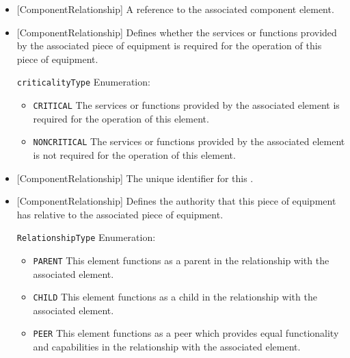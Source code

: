 \begin{itemize}

\item {}[ComponentRelationship] \newline A reference to the associated component element.

\item {}[ComponentRelationship] \newline Defines whether the services or functions provided by the associated piece of equipment is required for the operation of this piece of equipment.

\texttt{criticalityType} Enumeration:

\begin{itemize}
\item \texttt{CRITICAL} \newline The services or functions provided by the associated element is required for the operation of this element. 
\item \texttt{NONCRITICAL} \newline The services or functions provided by the associated element is not required for the operation of this element. 
\end{itemize}


\item {}[ComponentRelationship] \newline The unique identifier for this .

\item {}[ComponentRelationship] \newline Defines the authority that this piece of equipment has relative to the associated piece of equipment.

\texttt{RelationshipType} Enumeration:

\begin{itemize}
\item \texttt{PARENT} \newline This element functions as a parent in the relationship with the associated element. 
\item \texttt{CHILD} \newline This element functions as a child in the relationship with the associated element. 
\item \texttt{PEER} \newline This element functions as a peer which provides equal functionality and capabilities in the relationship with the associated element. 
\end{itemize}

\end{itemize}



